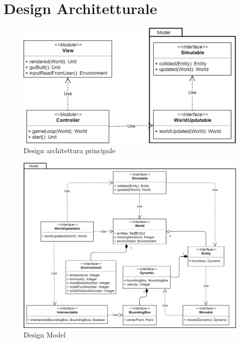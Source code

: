 \section{Design Architetturale}

\begin{figure}[h!]
\centering
\includegraphics[width=\textwidth, scale=0.44]{img/MainArchitecture.png}
\caption{Design architettura principale}
\label{fig:mainarchitecture}
\end{figure}

\begin{figure}[h!]
\centering
\includegraphics[width=\textwidth, scale=0.44]{img/Model.png}
\caption{Design Model}
\label{fig:model}
\end{figure}

